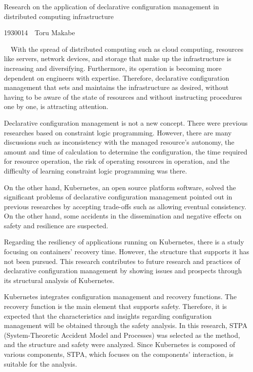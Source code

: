 \documentclass[12pt,a4paper]{article}
\begin{document}
\begin{center}
Research on the application of declarative configuration management in distributed computing infrastructure
\end{center}
\begin{flushright}
1930014~~Toru Makabe
\end{flushright}
　With the spread of distributed computing such as cloud computing, resources like servers, network devices, and storage that make up the infrastructure is increasing and diversifying. Furthermore, its operation is becoming more dependent on engineers with expertise. Therefore, declarative configuration management that sets and maintains the infrastructure as desired, without having to be aware of the state of resources and without instructing procedures one by one, is attracting attention.

Declarative configuration management is not a new concept. There were previous researches based on constraint logic programming. However, there are many discussions such as inconsistency with the managed resource's autonomy, the amount and time of calculation to determine the configuration, the time required for resource operation, the risk of operating resources in operation, and the difficulty of learning constraint logic programming was there.

On the other hand, Kubernetes, an open source platform software, solved the significant problems of declarative configuration management pointed out in previous researches by accepting trade-offs such as allowing eventual consistency. On the other hand, some accidents in the dissemination and negative effects on safety and resilience are suspected.

Regarding the resiliency of applications running on Kubernetes, there is a study focusing on containers' recovery time. However, the structure that supports it has not been pursued. This research contributes to future research and practices of declarative configuration management by showing issues and prospects through its structural analysis of Kubernetes.

Kubernetes integrates configuration management and recovery functions. The recovery function is the main element that supports safety. Therefore, it is expected that the characteristics and insights regarding configuration management will be obtained through the safety analysis. In this research, STPA (System-Theoretic Accident Model and Processes) was selected as the method, and the structure and safety were analyzed. Since Kubernetes is composed of various components, STPA, which focuses on the components' interaction, is suitable for the analysis.
\end{document}
